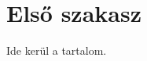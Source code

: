 \documentclass[11pt]{article}
\begin{document}

\section{Első szakasz}

Ide kerül a tartalom.
\end{document}
